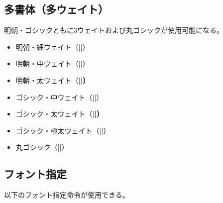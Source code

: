 \documentclass[dvipdfmx]{jlreq}
\newcommand{\cmd}[1]{\eghostguarded{\texttt{\symbol{92}#1}}}
\newcommand{\meta}[1]{$\langle$\nobreak\hspace{0pt}#1\nobreak\hspace{0pt}$\rangle$}
\begin{document}
\subsection{多書体（多ウェイト）}

明朝・ゴシックともに3ウェイトおよび丸ゴシックが使用可能になる。

\begin{itemize}
\item 明朝・細ウェイト（|\mcfamily\ltseries|）
\item 明朝・中ウェイト（|\mcfamily\mdseries|）
\item 明朝・太ウェイト（|\mcfamily\bfseries|）
\item ゴシック・中ウェイト（|\gtfamily\mdseries|）
\item ゴシック・太ウェイト（|\gtfamily\bfseries|）
\item ゴシック・極太ウェイト（|\gtfamily\ebseries|）
\item 丸ゴシック（|\mgfamily|）
\end{itemize}




\subsection{フォント指定}

以下のフォント指定命令が使用できる。
\end{document}
